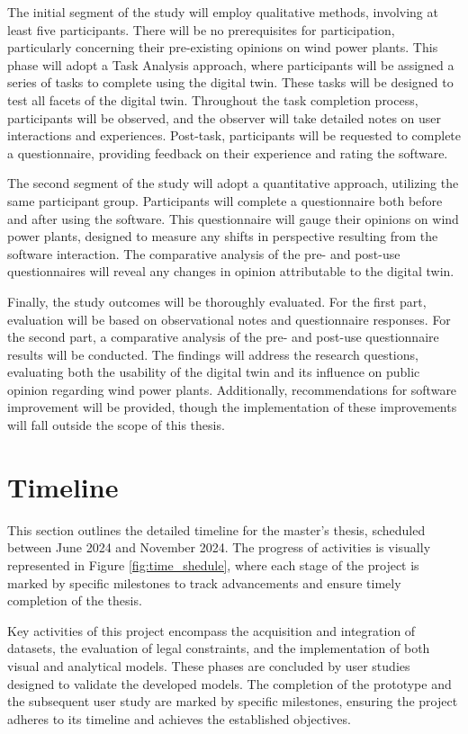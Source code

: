 \documentclass[11pt, titlepage, a4paper]{scrartcl}
\begin{document}
\begin{linenumbers}
    The initial segment of the study will employ qualitative methods, involving at least five participants. There will be no prerequisites for participation, particularly concerning their pre-existing opinions on wind power plants. This phase will adopt a Task Analysis approach, where participants will be assigned a series of tasks to complete using the digital twin. These tasks will be designed to test all facets of the digital twin. Throughout the task completion process, participants will be observed, and the observer will take detailed notes on user interactions and experiences. Post-task, participants will be requested to complete a questionnaire, providing feedback on their experience and rating the software.

    The second segment of the study will adopt a quantitative approach, utilizing the same participant group. Participants will complete a questionnaire both before and after using the software. This questionnaire will gauge their opinions on wind power plants, designed to measure any shifts in perspective resulting from the software interaction. The comparative analysis of the pre- and post-use questionnaires will reveal any changes in opinion attributable to the digital twin.

    Finally, the study outcomes will be thoroughly evaluated. For the first part, evaluation will be based on observational notes and questionnaire responses. For the second part, a comparative analysis of the pre- and post-use questionnaire results will be conducted. The findings will address the research questions, evaluating both the usability of the digital twin and its influence on public opinion regarding wind power plants. Additionally, recommendations for software improvement will be provided, though the implementation of these improvements will fall outside the scope of this thesis.


    \section{Timeline}
    This section outlines the detailed timeline for the master's thesis, scheduled between June 2024 and November 2024.
    The progress of activities is visually represented in Figure \ref{fig:time_shedule}, where each stage of the project is marked by specific milestones to track advancements and ensure timely completion of the thesis.

   
    Key activities of this project encompass the acquisition and integration of datasets, the evaluation of legal constraints, and the implementation of both visual and analytical models. These phases are concluded by user studies designed to validate the developed models. The completion of the prototype and the subsequent user study are marked by specific milestones, ensuring the project adheres to its timeline and achieves the established objectives.


\end{linenumbers}
\end{document}
